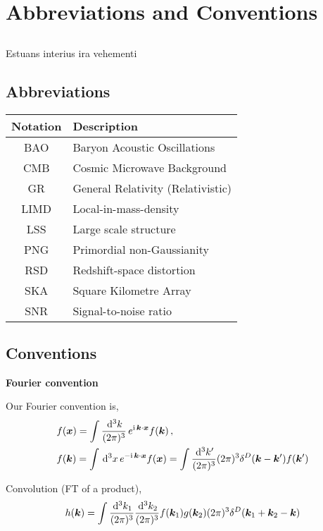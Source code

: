 \chapter*{Abbreviations and Conventions}
\label{chapter:conventions}
\section*{}
\singlespacing

Estuans interius ira vehementi

\section*{Abbreviations}
\setlength{\tabcolsep}{14pt}
\begin{center}
\begin{tabular}{c | l}
	\textbf{Notation} & \textbf{Description} \\
	\hline
	BAO & Baryon Acoustic Oscillations \\
	CMB & Cosmic Microwave Background \\
	GR & General Relativity (Relativistic) \\
	LIMD & Local-in-mass-density \\
	LSS & Large scale structure \\
	PNG & Primordial non-Gaussianity \\
	RSD & Redshift-space distortion \\
	SKA & Square Kilometre Array \\
	SNR & Signal-to-noise ratio 
\end{tabular}
\end{center}
\section*{Conventions}

\textbf{Fourier convention}


Our Fourier convention is, 
\begin{align*}
	&f(\bm {x}) = \int \frac{\,\mathrm{d}^3 k}{(2\pi)^3}\, e^{\mathrm{i\,} \bm {k} \cdot \bm {x}} f(\bm {k})\,,\\
	&f(\bm {k}) = \int \,\mathrm{d}^3x\, e^{- \mathrm{i\,} \bm {k}\cdot\bm {x}} f(\bm {x}) = \int \frac{\,\mathrm{d}^3 k'}{(2\pi)^3} (2\pi)^3 \delta^D(\bm {k}-\bm {k}') f(\bm {k}')
\end{align*}

Convolution (FT of a product), 
\begin{equation}
	h(\bm {k}) = \int \frac{\,\mathrm{d}^3k_1}{(2\pi)^3} \frac{\,\mathrm{d}^3k_2}{(2\pi)^3} f(\bm {k}_1) g(\bm {k}_2) (2\pi)^3 \delta^D(\bm {k}_1 +\bm {k}_2 - \bm {k})
\end{equation}



